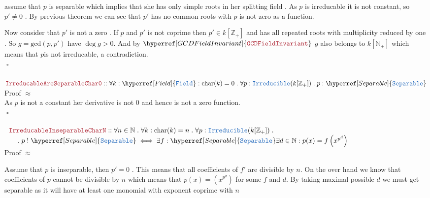 \documentclass[12pt]{article}
\newcommand{\TYPE}[1]{\textcolor{NavyBlue}{\mathtt{#1}}}
\newcommand{\THM}[1]{\textcolor{Maroon}{\mathtt{#1}}}
\renewcommand{\.}{\; . \;}
\newcommand{\IsNot}{\; ! \;}
\newcommand{\NNInt}{\mathbb{Z}_{+} }
\newcommand{\Nat}{\mathbb{N} }
\newcommand{\QED}{\; \square}
\newcommand{\Irr}{\TYPE{Irreducible}}
\newcommand{\cha}{\mathrm{char}}
\newcommand{\Field}{\hyperref[Field]{\TYPE{Field}}}
\newcommand{\Sep}{\hyperref[Separable]{\TYPE{Separable}}}
\renewcommand{\gcd}{\hyperref[gcd]{\mathrm{gcd}}}
\newcommand{\GCDFI}{\hyperref[GCDFieldInvariant]{\THM{GCDFieldInvariant}}}
\begin{document}
   assume that $p$ is separable which implies that she has only simple roots in her splitting field . As $p$ is irreducable it is not constant, so $p' \neq 0$ . By previous theorem we can see that $p'$ has no common roots with $p$  is not  zero as a function.
   
   Now consider that $p'$ is not a zero . If $p$ and $p'$ is not coprime then $p' \in k[\NNInt]$ and has all repeated roots with multiplicity reduced by one . So $g =\gcd(p,p')$ have $\deg g > 0$. And by $\GCDFI$ $g$ also belongs to $k[\Nat_+]$  which means that $p$is not irreducable, a contradiction.\\
   $\QED$
 \\ \\
  $
 \THM{IrreducableAreSeparableChar0} :: \forall k : \Field : \cha(k) = 0 \. \forall p : \Irr( k[\NNInt] ) \.
  p : \Sep 
 $\\
 Proof $\approx$ \\
 As $p$ is not a constant her derivative is not $0$ and hence is not a zero function. \\
 $\QED$
  \\ \\
 $
 \begin{array}{l}
  \THM{IrreducableInseparableCharN} :: \forall n \in \Nat \. \forall k : 
   \cha(k) =  n  \. \forall p : \Irr(k[\NNInt]) \. \\ \quad \. 
    p \IsNot \Sep \iff \exists f : \Sep \exists d \in \Nat  : p(x) = f\left (x^{p^d} \right )    
    \end{array}
 $  \\
Proof $\approx$  
  
  Assume that  $p$ is inseparable, then $p' = 0$ . This means that all coefficients of $f'$ are divisible by $n$. On the over hand we know that coefficients of $p$ cannot be divisible by $n$  which means that $p(x) =(x^{p^d})$ for some  $f$ and $d$. By taking maximal possible $d$ we must get separable as it will have at least one monomial with exponent coprime with $n$
  
\end{document}
